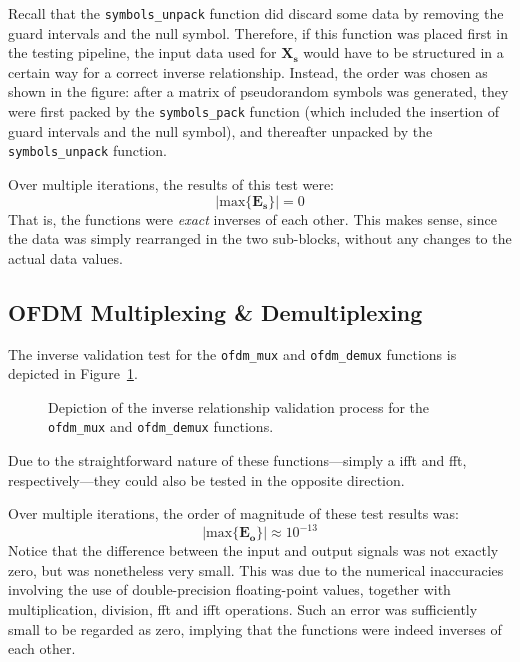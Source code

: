 \documentclass[class=report,11pt,crop=false]{standalone}
\begin{document}
Recall that the \texttt{symbols\_unpack} function did discard some data by removing the guard intervals and the null symbol. Therefore, if this function was placed first in the testing pipeline, the input data used for \(\mathbf{X_s}\) would have to be structured in a certain way for a correct inverse relationship. Instead, the order was chosen as shown in the figure: after a matrix of pseudorandom symbols was generated, they were first packed by the \texttt{symbols\_pack} function (which included the insertion of guard intervals and the null symbol), and thereafter unpacked by the \texttt{symbols\_unpack} function.

Over multiple iterations, the results of this test were:
\begin{equation}
  \left| \mathrm{max} \{ \mathbf{E_s} \} \right| = 0
\end{equation}
That is, the functions were \emph{exact} inverses of each other. This makes sense, since the data was simply rearranged in the two sub-blocks, without any changes to the actual data values.

\subsection{OFDM Multiplexing \& Demultiplexing}
The inverse validation test for the \texttt{ofdm\_mux} and \texttt{ofdm\_demux} functions is depicted in Figure~\ref{fig:inverse-ofdm-mux-demux}.
\begin{figure}[htbp]
  \centering
  \captionsetup{type=figure}
  \def\svgwidth{0.95\linewidth}
  { %
      }
  \caption{Depiction of the inverse relationship validation process for the \texttt{ofdm\_mux} and \texttt{ofdm\_demux} functions.}
  \label{fig:inverse-ofdm-mux-demux}
\end{figure}
Due to the straightforward nature of these functions---simply a \gls{ifft} and \gls{fft}, respectively---they could also be tested in the opposite direction.

Over multiple iterations, the order of magnitude of these test results was:
\begin{equation}
  \left| \mathrm{max} \{ \mathbf{E_o} \} \right| \approx 10^{-13}
\end{equation}
Notice that the difference between the input and output signals was not exactly zero, but was nonetheless very small. This was due to the numerical inaccuracies involving the use of double-precision floating-point values, together with multiplication, division, \gls{fft} and \gls{ifft} operations. Such an error was sufficiently small to be regarded as zero, implying that the functions were indeed inverses of each other.
\end{document}
